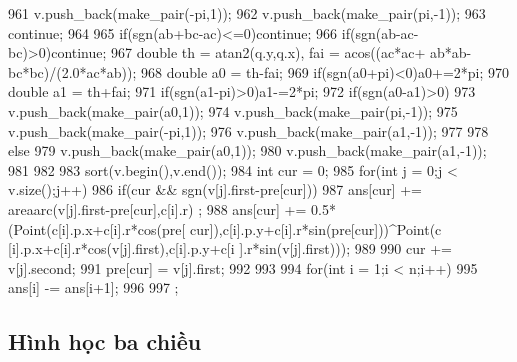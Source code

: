\documentclass[11pt]{article}
\begin{document}
\begin{Code}
{{{{{961                              v.push_back(make_pair(-pi,1));
962                              v.push_back(make_pair(pi,-1));
963                              continue;
964                          }
965                          if(sgn(ab+bc-ac)<=0)continue;
966                          if(sgn(ab-ac-bc)>0)continue;
967                          double th = atan2(q.y,q.x), fai = acos((ac*ac+
                                ab*ab-bc*bc)/(2.0*ac*ab));
968                          double a0 = th-fai;
969                          if(sgn(a0+pi)<0)a0+=2*pi;
970                          double a1 = th+fai;
971                          if(sgn(a1-pi)>0)a1-=2*pi;
972                          if(sgn(a0-a1)>0){
973                              v.push_back(make_pair(a0,1));
974                              v.push_back(make_pair(pi,-1));
975                              v.push_back(make_pair(-pi,1));
976                              v.push_back(make_pair(a1,-1));
977                          }
978                          else{
979                              v.push_back(make_pair(a0,1));
980                              v.push_back(make_pair(a1,-1));
981                          }
982                      }
983                  sort(v.begin(),v.end());
984                  int cur = 0;
985                  for(int j = 0;j < v.size();j++){
986                      if(cur && sgn(v[j].first-pre[cur])){
987                          ans[cur] += areaarc(v[j].first-pre[cur],c[i].r)
                                ;
988                          ans[cur] += 0.5*(Point(c[i].p.x+c[i].r*cos(pre[
                                cur]),c[i].p.y+c[i].r*sin(pre[cur]))^Point(c
                                [i].p.x+c[i].r*cos(v[j].first),c[i].p.y+c[i
                                ].r*sin(v[j].first)));
989                      }
990                      cur += v[j].second;
991                      pre[cur] = v[j].first;
992                  }
993              }
994              for(int i = 1;i < n;i++)
995                  ans[i] -= ans[i+1];
996         }
997 };
\end{Code}

\subsection{Hình học ba chiều}
\end{document}
